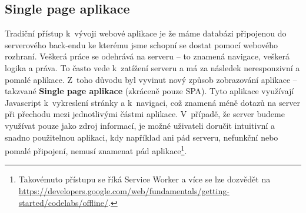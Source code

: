 \subsection{Single page aplikace}
\par Tradiční přístup k~vývoji webové aplikace je že máme databázi připojenou do serverového back-endu ke kterému jsme schopní se dostat pomocí webového rozhraní. Veškerá práce se odehrává na serveru -- to znamená navigace, veškerá logika a práva. To často vede k~zatížení serveru a má za následek neresponzivní a pomalé aplikace. Z~toho důvodu byl vyvinut nový způsob zobrazování aplikace -- takzvané \textbf{Single page aplikace} (zkráceně pouze SPA). Tyto aplikace využívají Javascript k~vykreslení stránky a k~navigaci, což znamená méně dotazů na server při přechodu mezi jednotlivými částmi aplikace. V~případě, že server budeme využívat pouze jako zdroj informací, je možné uživateli doručit intuitivní a snadno použitelnou aplikaci, kdy například ani pád serveru, nefunkční nebo pomalé připojení, nemusí znamenat pád aplikace\footnote{Takovémuto přístupu se říká Service Worker a více se lze dozvědět na \url{https://developers.google.com/web/fundamentals/getting-started/codelabs/offline/}.}. \cite{serverless-singlepage-apps}

